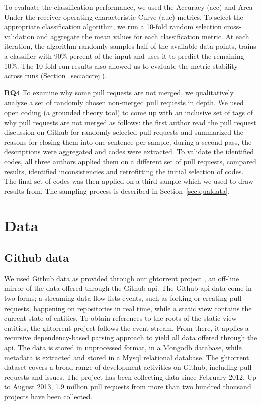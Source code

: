 \documentclass{sig-alternate}
\begin{document}
To evaluate the classification performance, we used the Accuracy ({\sc acc}) and
Area Under the receiver operating characteristic Curve ({\sc auc}) metrics. To
select the appropriate classification algorithm, we run a 10-fold random
selection cross-validation and aggregate the mean values for each classification
metric. At each iteration, the algorithm randomly samples half of the
available data points, trains a classifier with 90\% percent of the input and
uses it to predict the remaining 10\%. The 10-fold run results also allowed us to
evaluate the metric stability across runs (Section~\ref{sec:accrej}).

{\bfseries RQ4} To examine why some pull requests are not merged, we
qualitatively analyze a set of randomly chosen non-merged pull requests in
depth. We used open coding (a grounded theory tool) to come up with an inclusive
set of tags of why pull requests are not merged as follows: the first author
read the pull request discussion on Github for randomly selected pull requests
and summarized the reasons for closing them into one sentence per sample; during
a second pass, the descriptions were aggregated and codes were extracted. To
validate the identified codes, all three authors applied them on a different set
of pull requests, compared results, identified inconsistencies and retrofitting
the initial selection of codes. The final set of codes was then applied on a
third sample which we used to draw results from. The sampling process
is described in Section~\ref{sec:qualdata}.

\section{Data}

\subsection{Github data}
\label{sec:ghtorrent}

We used Github data as provided through our {\sc ght}orrent project \cite{G13},
an off-line mirror of the data
offered through the Github {\sc api}. The Github {\sc api} 
data come in two forms; a streaming
data flow lists events, such as forking or creating pull requests, happening on
repositories in real time, while a static view contains the current state of
entities. To obtain references to the roots of the static view entities, the
{\sc ght}orrent project follows the event stream. From there, it applies a
recursive dependency-based parsing approach to yield all data offered through
the {\sc api}. The data is stored in unprocessed format, in a Mongo{\sc db}
database, while metadata is extracted and stored in a My{\sc sql} relational
database. The {\sc ght}orrent dataset covers a broad range of development
activities on Github, including pull requests and issues. The project
has been collecting data since February 2012. Up to August 2013,
1.9 million pull requests from more than two hundred thousand projects
have been collected.
\end{document}
